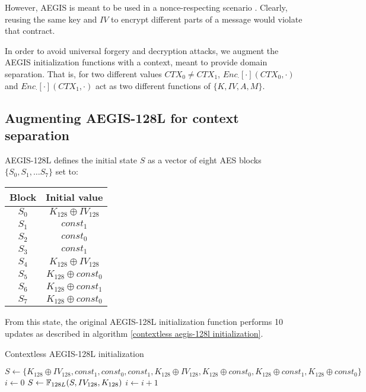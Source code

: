\documentclass[envcountsame,runningheads,notitlepage]{llncs}
\begin{document}
However, AEGIS is meant to be used in a nonce-respecting scenario \cite{ACNS:VauViz18}. Clearly, reusing the same key and $IV$ to encrypt different parts of a message would violate that contract.

In order to avoid universal forgery and decryption attacks, we augment the AEGIS initialization functions with a context, meant to provide domain separation. That is, for two different values $CTX_0 \neq CTX_1$, $Enc_{\cdot}[\cdot](CTX_0, \cdot)$ and $Enc_{\cdot}[\cdot](CTX_1, \cdot)$ act as two different functions of $\{ K, IV, A, M \}$.

\subsection{Augmenting AEGIS-128L for context separation}
\label{sec:augmenting AEGIS-128L for context separation}

AEGIS-128L defines the initial state $S$ as a vector of eight AES blocks $\{S_0, S_1, \ldots S_7\}$ set to:

\begin{center}
  \begin{tabular}{|c|c|}
    \hline
    Block & Initial value             \\
    \hline
    $S_0$ & $K_{128} \oplus IV_{128}$ \\
    \hline
    $S_1$ & $const_1$                 \\
    \hline
    $S_2$ & $const_0$                 \\
    \hline
    $S_3$ & $const_1$                 \\
    \hline
    $S_4$ & $K_{128} \oplus IV_{128}$ \\
    \hline
    $S_5$ & $K_{128} \oplus const_0$  \\
    \hline
    $S_6$ & $K_{128} \oplus const_1$  \\
    \hline
    $S_7$ & $K_{128} \oplus const_0$  \\
    \hline
  \end{tabular}
\end{center}

From this state, the original AEGIS-128L initialization function performs 10 updates as described in algorithm \ref{contextless aegis-128l initialization}.

\begin{algorithm}
  \caption{Contextless AEGIS-128L initialization}
  \label{contextless aegis-128l initialization}
  \begin{algorithmic}
    \State $S \gets \{ K_{128} \oplus IV_{128}, const_1, const_0, const_1, K_{128} \oplus IV_{128}, K_{128} \oplus const_0, K_{128} \oplus const_1, K_{128} \oplus const_0 \}$
    \State $i \gets 0$
    \State $S \gets \mathbb{F}_{128L}(S, IV_{128}, K_{128})$
    \State $i \gets i+1$
    \EndWhile
    \EndFunction
  \end{algorithmic}
\end{algorithm}
\end{document}
